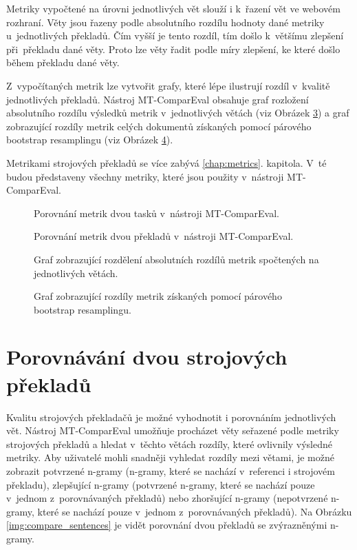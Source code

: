 Metriky vypočtené na úrovni jednotlivých vět slouží i k~řazení vět ve webovém rozhraní.
Věty jsou řazeny podle absolutního rozdílu hodnoty dané metriky u~jednotlivých překladů.
Čím vyšší je tento rozdíl, tím došlo k~většímu zlepšení při~překladu dané věty.
Proto lze věty řadit podle míry zlepšení, ke které došlo během překladu dané věty. 

Z~vypočítaných metrik lze vytvořit grafy,
  které lépe ilustrují rozdíl v~kvalitě jednotlivých překladů.
Nástroj \mbox{MT-ComparEval} obsahuje graf rozložení absolutního rozdílu výsledků metrik v~jednotlivých větách (viz Obrázek \ref{img:chart-metrics-sentences})
  a graf zobrazující rozdíly metrik celých dokumentů získaných pomocí párového bootstrap resamplingu (viz Obrázek \ref{img:chart-metrics-bs}).

Metrikami strojových překladů se více zabývá \ref{chap:metrics}. kapitola.
V~té budou představeny všechny metriky,
  které jsou použity v~nástroji \mbox{MT-ComparEval}.


\begin{figure}
	\caption{Porovnání metrik dvou tasků v~nástroji \mbox{MT-ComparEval}.}
	\label{img:compare_metrics_tasks}
\end{figure}

\begin{figure}
	\caption{Porovnání metrik dvou překladů v~nástroji \mbox{MT-ComparEval}.}
	\label{img:compare_metrics_sentences}
\end{figure}

\begin{figure}
	\caption{Graf zobrazující rozdělení absolutních rozdílů metrik spočtených na jednotlivých větách.}
	\label{img:chart-metrics-sentences}
\end{figure}

\begin{figure}
	\caption{Graf zobrazující rozdíly metrik získaných pomocí párového bootstrap resamplingu.}
	\label{img:chart-metrics-bs}
\end{figure}

\section{Porovnávání dvou strojových překladů}
Kvalitu strojových překladačů je možné vyhodnotit i porovnáním jednotlivých vět.
Nástroj \mbox{MT-ComparEval} umožňuje procházet věty seřazené podle metriky strojových překladů 
  a hledat v~těchto větách rozdíly,
  které ovlivnily výsledné metriky.
Aby uživatelé mohli snadněji vyhledat rozdíly mezi větami,
  je možné zobrazit potvrzené \mbox{n-gramy} (\mbox{n-gramy}, které se nachází v~referenci i strojovém překladu),
  zlepšující \mbox{n-gramy} (potvrzené \mbox{n-gramy}, které se nachází pouze v~jednom z~porovnávaných překladů)
  nebo zhoršující \mbox{n-gramy} (nepotvrzené \mbox{n-gramy}, které se nachází pouze v~jednom z~porovnávaných překladů).
Na Obrázku \ref{img:compare_sentences} je vidět porovnání dvou překladů se zvýrazněnými \mbox{n-gramy}.

